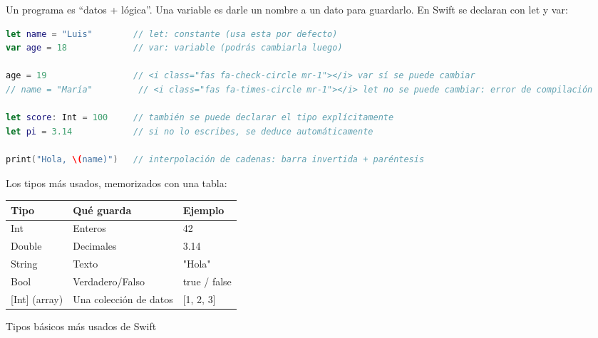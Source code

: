 


Un programa es “datos + lógica”. Una variable es darle un nombre a un dato para guardarlo. En Swift se declaran con let y var:

\begin{lstlisting}[language=Swift]
let name = "Luis"        // let: constante (usa esta por defecto)
var age = 18             // var: variable (podrás cambiarla luego)

age = 19                 // <i class="fas fa-check-circle mr-1"></i> var sí se puede cambiar
// name = "María"         // <i class="fas fa-times-circle mr-1"></i> let no se puede cambiar: error de compilación

let score: Int = 100     // también se puede declarar el tipo explícitamente
let pi = 3.14            // si no lo escribes, se deduce automáticamente

print("Hola, \(name)")   // interpolación de cadenas: barra invertida + paréntesis
\end{lstlisting}

Los tipos más usados, memorizados con una tabla:

\begin{center}
\begin{tabularx}{\linewidth}{|X|X|X|}
\hline
\textbf{Tipo} & \textbf{Qué guarda} & \textbf{Ejemplo} \tabularnewline
\hline
Int & Enteros & 42 \tabularnewline
Double & Decimales & 3.14 \tabularnewline
String & Texto & "Hola" \tabularnewline
Bool & Verdadero/Falso & true / false \tabularnewline
{}[Int] (array) & Una colección de datos & {}[1, 2, 3] \tabularnewline
\hline
\end{tabularx}
\end{center}

\begin{center}\small\color{gray}Tipos básicos más usados de Swift\end{center}

